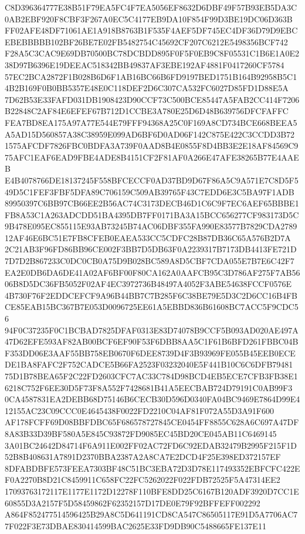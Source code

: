 \documentclass[UTF8,fontset=fandol,zihao=-4,a4paper]{ctexart}
\begin{document}
{{C8D396364777E38B51F79EA5FC4F7EA5056EF8632D6DBF49F57B93EB5DA3C0AB2EBF920F8CBF3F267A0EC5C4177EB9DA10F854F99D3BE19DC06D363B
FF02AFE48DF71061AE1A918B8763B1F535F4AEF5DF745EC4DF36D79D9EBCEBEBBBBB102BF26BE7E02FB5482754C45692CF207C6212E5498356BCF742
F28A5C3CAC9E69DB70500BC78DCBDD895F0F5F0EB9C8F05531C1B6E1A0E238D97B6396E19DEEAC518342BB49837AF3EBE192AF4881F0417260CF5784
57EC2BCA2872F1B028B6D6F1AB16BC66B6FD9197BED1751B164B92958B5C14B2B169F0B0BB5357E48E0C118DEF2D6C307CA532FC6027D85FD1D88E5A
7D62B53E33FAFD031DB1908423D90CCF73C500BCE85447A5FAB2CC414F7206B22848C2AF84E6EFEF67B712D1CCBE3A780E25D6D48B639756DFCFAFFC
FEA7BD8EA175A97A77E544E79FFF94368A25C0F169A8CD734BCE668BEEA5A5AD15D560857A38C38959E099AD6BF6D0AD06F142C875E422C3CCDD3B72
1575AFCDF7826FBC0BDFA3A739F0AAD8B4E0855F8D4BB3E2E18AF84569C975AFC1EAF6EAD9FBE4ADE8B4151CF2F81AF0A266E47AFE38265B77E4AAEB
E4B4078766DE18137245F558BFCECCF0AD37BD9D67F86A5C9A571E7C8D5F549D5C1FEF3FBF5DFA89C706159C509AB39765F43C7EDD6E3C5BA97F1ADB
89950397C6BB97CB66EE2B56AC74C3173DECB46D1C6C9F7EC6AEF65BBBE1FB8A53C1A263ADCDD51BA4395DB7FF0171BA3A15BCC656277CF983173D5C
9B478E095EC855115E93AB73245B74AC06DBF355FA990E83577B7829CDA278912AF46E6BC51E7FB8CFEB0EAEA533CC5CDFC28B87DB36C65A576B2D7A
2C21AB3F96FD86BB96CE002F3BB7D5DB63F0A2239317B7173DB4413FE721D7D7D2B867233C0DC0CB0A75D9B028BC589A8D5CBF7CDA055E7B7E6C42F7
EA2E0DB6DA6DE41A02AF6BF00F80CA162A0AAFCB95C3D786AF275F7AB5606B8D5DC36FB5052F02AF4EC3972736B48497A4052F3ABE54638FCCF0576E
4B730F76F2EDDCEFCF9A96B44BB7C7B285F6C38BE79E5D3C2D6CC16B4FBCE85EAB15BC367B7E053D0096725EE61A5EBBD836B61608BC7ACC5F9CDC56
94F0C37235F0C1BCBAD7825DFAF0313E83D74078B9CCF5B093AD020AE497A47D62EFE593AF82AB00BCF6EF90F53F6DBB8AA5C1F61B6BFD261FBBC04B
F353DD06E3AAF55BB758EB0670F6DEE8739D4F3B93969FE055B45EEB0ECEDE1BA8FAFC2F752CADCE5B66FA2523F03232040E5F441B10C6C6DFB79481
75D1B78BEA65F2C22FD2603CFC7AC33C784D98BCD4EB5ECE7CFB3FB38E16218C752F6EE30D5F73F8A552F7428681B41A5EECBAB724D79191C0AB99F3
0CA4587831EA2DEBB68D75146B6CECB30D596D0340FA04BC9469E7864D99E412155AC23C09CCC0E4645438F0022FD2210C04AF81F072A55D3A91F600
AF178FCFF69D08BBFDBC65F686578727845CE0454FF8855C628A6C697A47DF8A83B33D39BF580A5E845C93872FD9085EC45BD20CE045AB11C6469145
3A01BC24642D84714F6A911E002FF02AC72FD6C92EDAB32479B2995F215F1D52B8B408631A7891D2370BBA2387A2A8CA7E2DCD4F25E398ED372157EF
8DFABDBFE573FEEA7303BF48C51BC3EBA72D3D78E117493352EBFCFC422EF0A2270B8D21C8459911C658FC22FC5262022F022FDB72525F5A47314EE2
17093763172117E1177E1172D12278F110BFE8DD25C6167B120ADF3920D7CC1E60855D3A2157F5D58459862F62352157D17DE0E79F92BFFEFF002292
A864F852477514596425B29A8C5D641191CD8CA547C86505117E91D5A7706AC77F022F3E73DBAE830414599BAC2625E33FD9DB90C5488665FE137E11
}}
\end{document}
